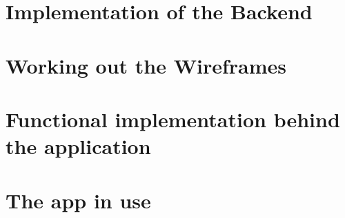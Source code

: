 \section{Implementation of the Backend}


\section{Working out the Wireframes}


\section{Functional implementation behind the application}


\section{The app in use}
